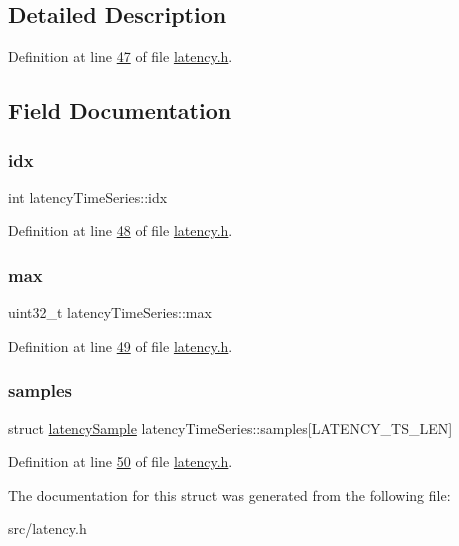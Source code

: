 \subsection{Detailed Description}


Definition at line \hyperlink{latency_8h_source_l00047}{47} of file \hyperlink{latency_8h_source}{latency.\+h}.



\subsection{Field Documentation}
\mbox{\label{structlatencyTimeSeries_a4e4ff86c4d49c4ef123dd4887fb367aa}} 
\subsubsection{\texorpdfstring{idx}{idx}}
{\footnotesize\ttfamily int latency\+Time\+Series\+::idx}



Definition at line \hyperlink{latency_8h_source_l00048}{48} of file \hyperlink{latency_8h_source}{latency.\+h}.

\mbox{\label{structlatencyTimeSeries_a8ad82b8920ab3169a8fdb69d10502bb9}} 
\subsubsection{\texorpdfstring{max}{max}}
{\footnotesize\ttfamily uint32\+\_\+t latency\+Time\+Series\+::max}



Definition at line \hyperlink{latency_8h_source_l00049}{49} of file \hyperlink{latency_8h_source}{latency.\+h}.

\mbox{\label{structlatencyTimeSeries_aa9987016e8c94d967f55575f77e337eb}} 
\subsubsection{\texorpdfstring{samples}{samples}}
{\footnotesize\ttfamily struct \hyperlink{structlatencySample}{latency\+Sample} latency\+Time\+Series\+::samples\mbox{[}L\+A\+T\+E\+N\+C\+Y\+\_\+\+T\+S\+\_\+\+L\+EN\mbox{]}}



Definition at line \hyperlink{latency_8h_source_l00050}{50} of file \hyperlink{latency_8h_source}{latency.\+h}.



The documentation for this struct was generated from the following file\+:\begin{DoxyCompactItemize}
\item 
src/latency.\+h\end{DoxyCompactItemize}
